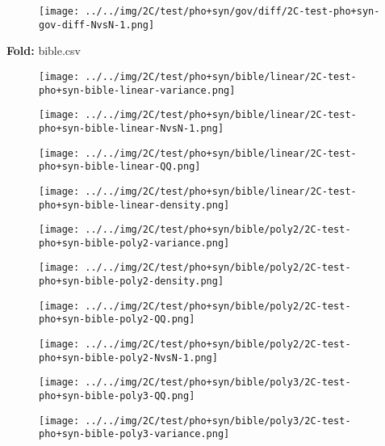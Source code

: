 \begin{figure}[H]
\centering	\texttt{[image: ../../img/2C/test/pho+syn/gov/diff/2C-test-pho+syn-gov-diff-NvsN-1.png]}
\end{figure}
\textbf{Fold:} bible.csv
\begin{figure}[H]
\centering	\texttt{[image: ../../img/2C/test/pho+syn/bible/linear/2C-test-pho+syn-bible-linear-variance.png]}
\end{figure}
\begin{figure}[H]
\centering	\texttt{[image: ../../img/2C/test/pho+syn/bible/linear/2C-test-pho+syn-bible-linear-NvsN-1.png]}
\end{figure}
\begin{figure}[H]
\centering	\texttt{[image: ../../img/2C/test/pho+syn/bible/linear/2C-test-pho+syn-bible-linear-QQ.png]}
\end{figure}
\begin{figure}[H]
\centering	\texttt{[image: ../../img/2C/test/pho+syn/bible/linear/2C-test-pho+syn-bible-linear-density.png]}
\end{figure}
\begin{figure}[H]
\centering	\texttt{[image: ../../img/2C/test/pho+syn/bible/poly2/2C-test-pho+syn-bible-poly2-variance.png]}
\end{figure}
\begin{figure}[H]
\centering	\texttt{[image: ../../img/2C/test/pho+syn/bible/poly2/2C-test-pho+syn-bible-poly2-density.png]}
\end{figure}
\begin{figure}[H]
\centering	\texttt{[image: ../../img/2C/test/pho+syn/bible/poly2/2C-test-pho+syn-bible-poly2-QQ.png]}
\end{figure}
\begin{figure}[H]
\centering	\texttt{[image: ../../img/2C/test/pho+syn/bible/poly2/2C-test-pho+syn-bible-poly2-NvsN-1.png]}
\end{figure}
\begin{figure}[H]
\centering	\texttt{[image: ../../img/2C/test/pho+syn/bible/poly3/2C-test-pho+syn-bible-poly3-QQ.png]}
\end{figure}
\begin{figure}[H]
\centering	\texttt{[image: ../../img/2C/test/pho+syn/bible/poly3/2C-test-pho+syn-bible-poly3-variance.png]}
\end{figure}
